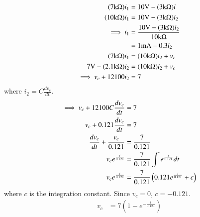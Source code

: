 \documentclass[journal,12pt,twocolumn]{IEEEtran}
\theoremstyle{remark}
\begin{document}
\begin{align}
(7\text{k}\ohm)i_1 &= 10\text{V} - (3\text{k}\ohm)i \\
(10\text{k}\ohm)i_1 &= 10\text{V} - (3\text{k}\ohm)i_2 \\
\implies i_1 &= \frac{10\text{V} - (3\text{k}\ohm)i_2}{10\text{k}\ohm} \\
&= 1\text{mA} - 0.3i_2\\
(7\text{k}\ohm)i_1 &= (10\text{k}\ohm)i_2 + v_c \\
7\text{V} - (2.1\text{k}\ohm)i_2 &= (10\text{k}\ohm)i_2 + v_c \\
\implies v_c + 12100i_2 &= 7
\end{align}
where $i_2 = C\frac{dv_c}{dt}$.
\begin{align}
\implies v_c + 12100C\frac{dv_c}{dt} &= 7 \\
v_c + 0.121\frac{dv_c}{dt} &= 7 \\
\frac{dv_c}{dt} + \frac{v_c}{0.121} &= \frac{7}{0.121} \\
v_ce^{\frac{t}{0.121}} &= \frac{7}{0.121}\int{e^{\frac{t}{0.121}}dt} \\
v_ce^{\frac{t}{0.121}} &= \frac{7}{0.121}\left(0.121e^{\frac{t}{0.121}} + c\right)
\end{align}
where $c$ is the integration constant.
Since $v_c = 0$, $c = -0.121$.
\begin{align}
v_c &= 7(1 - e^{-\frac{t}{0.121}})
\end{align}
\end{document}
